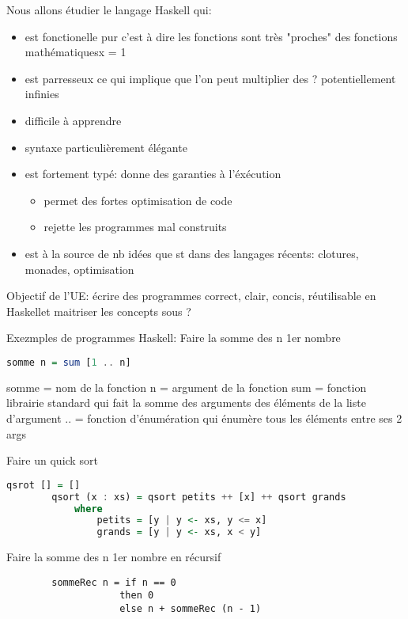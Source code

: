\documentclass{article}
\begin{document}
    Nous allons étudier le langage Haskell qui:
    \begin{itemize}
        \item est fonctionelle pur c'est à dire les fonctions sont très "proches" des fonctions mathématiquesx = 1
        \item est parresseux ce qui implique que l'on peut multiplier des ? potentiellement infinies
        \item difficile à apprendre
        \item syntaxe particulièrement élégante
        \item est fortement typé: donne des garanties à l'éxécution

        \begin{itemize}
            \item permet des fortes optimisation de code
            \item rejette les programmes mal construits
        \end{itemize}

        \item est à la source de nb idées que st dans des langages récents: clotures, monades, optimisation
    \end{itemize}

    Objectif de l'UE: écrire des programmes correct, clair, concis, réutilisable en Haskellet maitriser les concepts sous ?

    Exezmples de programmes Haskell:
    Faire la somme des n 1er nombre

    \begin{lstlisting}[language=Haskell]
        somme n = sum [1 .. n]
    \end{lstlisting}

    somme   = nom de la fonction
    n       = argument de la fonction
    sum     = fonction librairie standard qui fait la somme des arguments des éléments de la liste d'argument
    ..      = fonction d'énumération qui énumère tous les éléments entre ses 2 args

    Faire un quick sort
    \begin{lstlisting}[language=Haskell]
        qsrot [] = []
        qsort (x : xs) = qsort petits ++ [x] ++ qsort grands
            where
                petits = [y | y <- xs, y <= x]
                grands = [y | y <- xs, x < y]
    \end{lstlisting}

    Faire la somme des n 1er nombre en récursif
    \begin{lstlisting}
        sommeRec n = if n == 0
                    then 0
                    else n + sommeRec (n - 1)
    \end{lstlisting}
\end{document}

